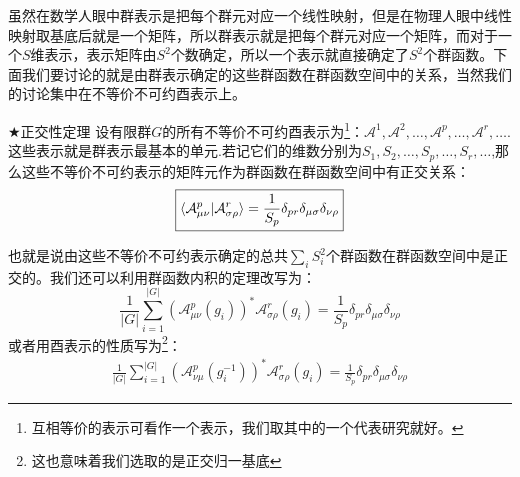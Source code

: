 虽然在数学人眼中群表示是把每个群元对应一个线性映射，但是在物理人眼中线性映射取基底后就是一个矩阵，所以群表示就是把每个群元对应一个矩阵，而对于一个$S$维表示，表示矩阵由$S^2$个数确定，所以一个表示就直接确定了$S^2$个群函数。下面我们要讨论的就是由群表示确定的这些群函数在群函数空间中的关系，当然我们的讨论集中在不等价不可约酉表示上。

\begin{theorem}{$\bigstar$正交性定理}
	设有限群$G$的所有不等价不可约酉表示为\footnote{互相等价的表示可看作一个表示，我们取其中的一个代表研究就好。}：$\mathscr{A}^1,\mathscr{A}^2,\ldots,\mathscr{A}^p,\ldots,\mathscr{A}^r,\ldots$.这些表示就是群表示最基本的单元.若记它们的维数分别为$S_1,S_2,\ldots,S_p,\ldots,S_r,\ldots$,那么这些不等价不可约表示的矩阵元作为群函数在群函数空间中有正交关系：
	\begin{equation}
		\boxed{
		\braket{\mathcal{A}^p_{\mu\nu}|\mathcal{A}^r_{\sigma\rho}}=\frac{1}{S_p}\delta_{pr}\delta_{\mu\sigma}\delta_{\nu\rho}	
	}
	\end{equation}
	
	也就是说由这些不等价不可约表示确定的总共$\sum_i S^2_i$个群函数在群函数空间中是正交的。我们还可以利用群函数内积的定理改写为：
	\begin{equation}
		\frac{1}{|G|}\sum_{i=1}^{|G|}(\mathcal{A}^p_{\mu\nu}(g_i))^*\mathcal{A}^r_{\sigma\rho}(g_i)=\frac{1}{S_p}\delta_{pr}\delta_{\mu\sigma}\delta_{\nu\rho}	
	\end{equation}
	或者用酉表示的性质写为\footnote{这也意味着我们选取的是正交归一基底}：
	\begin{eqnarray}
		\frac{1}{|G|}\sum_{i=1}^{|G|}(\mathcal{A}^p_{\nu\mu}(g_i^{-1}))^*\mathcal{A}^r_{\sigma\rho}(g_i)=\frac{1}{S_p}\delta_{pr}\delta_{\mu\sigma}\delta_{\nu\rho}
	\end{eqnarray}
\end{theorem}
